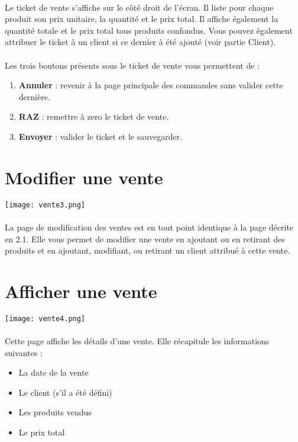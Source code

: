 \paragraph{}
Le ticket de vente s'affiche sur le côté droit de l'écran. Il liste pour chaque
produit son prix unitaire, la quantité et le prix total. Il affiche également
la quantité totale et le prix total tous produits confondus. Vous pouvez
également attribuer le ticket à un client si ce dernier à été ajouté (voir
partie Client).

\paragraph{}
Les trois boutons présents sous le ticket de vente vous permettent de :
\begin{enumerate}
    \item \textbf{Annuler} : revenir à la page principale des commandes sans
        valider cette dernière.
    \item \textbf{RAZ} : remettre à zero le ticket de vente.
    \item \textbf{Envoyer} : valider le ticket et le sauvegarder.
\end{enumerate}

\section{Modifier une vente}

\texttt{[image: vente3.png]}

\paragraph{}
La page de modification des ventes est en tout point identique à la page décrite en 2.1. Elle vous permet de modifier une vente en ajoutant ou en retirant des produits et en ajoutant, modifiant, ou retirant un client attribué à cette vente.

\section{Afficher une vente}

\texttt{[image: vente4.png]}

\paragraph{}
Cette page affiche les détails d'une vente. Elle récapitule les informations suivantes :
\begin{itemize}
    \item La date de la vente
    \item Le client (s'il a été défini)
    \item Les produits vendus
    \item Le prix total
\end{itemize}
